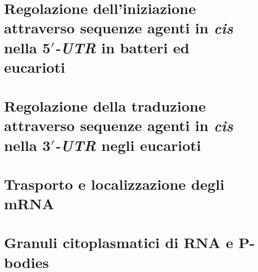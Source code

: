 \section{Regolazione dell'iniziazione attraverso sequenze agenti in \emph{cis} nella \emph{$\mathbf{5'}$-UTR} in batteri ed eucarioti}

\section{Regolazione della traduzione attraverso sequenze agenti in \emph{cis} nella \emph{$\mathbf{3'}$-UTR} negli eucarioti}

\section{Trasporto e localizzazione degli mRNA}

\section{Granuli citoplasmatici di RNA e P-bodies}

